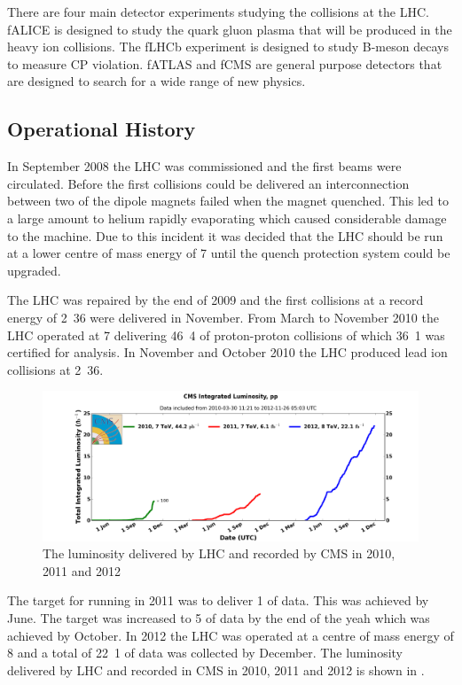 There are four main detector experiments studying the collisions at the
{LHC}.  f{ALICE} is designed to study the quark gluon plasma that will be
produced in the heavy ion collisions.  The f{LHCb} experiment is designed to
study B-meson decays to measure CP violation.  f{ATLAS} and f{CMS} are
general purpose detectors that are designed to search for a wide range of new
physics\cite{lhc}.

\subsection{Operational History}
In September 2008 the {LHC} was commissioned and the first beams were circulated.
Before the first collisions could be delivered an interconnection
between two of the dipole magnets failed when the magnet quenched.
This led to a large amount to helium rapidly evaporating which caused
considerable damage to the machine.
Due to this incident it was decided that the {LHC} should be run at a lower centre
of mass energy of \unit{7}{\TeV} until the quench protection system could be
upgraded.

The {LHC} was repaired by the end of 2009 and the first collisions at a record
energy of \unit{2.36}{\TeV} were delivered in November. 
From March to November 2010 the {LHC} operated at \unit{7}{\TeV} delivering
\unit{46.4}{\invpb} of proton-proton collisions of which \unit{36.1}{\invpb} was
certified for analysis.
In November and October 2010 the {LHC} produced lead ion collisions at
\unit{2.36}{\TeV}.

\begin{figure}[htbp]
  \centering
  \includegraphics[width=\textwidth]{int_lumi_cumulative_pp_1.png}
  \caption{The luminosity delivered by LHC and recorded by CMS in 2010, 2011 and 2012}
  \label{fig:LHC2010}
\end{figure}

The target for running in 2011 was to deliver \unit{1}{\invfb} of data. This was
achieved by June. The target was increased to \unit{5}{\invfb} of data by the end
of the yeah which was achieved by October. 
In 2012 the {LHC} was operated at a centre of mass energy of \unit{8}{\TeV}
and a total of \unit{22.1}{\invfb} of data was collected by December.
The luminosity delivered by LHC and recorded in CMS in 2010, 2011 and 2012 is
shown in .

